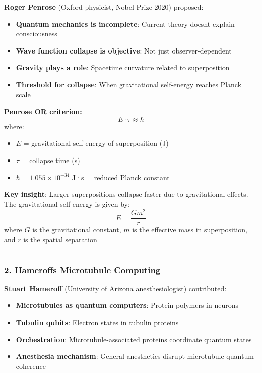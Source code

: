 \textbf{Roger Penrose} (Oxford physicist, Nobel Prize 2020) proposed:

\begin{itemize}
\tightlist
\item
  \textbf{Quantum mechanics is incomplete}: Current theory
  doesn\textquotesingle t explain consciousness
\item
  \textbf{Wave function collapse is objective}: Not just
  observer-dependent
\item
  \textbf{Gravity plays a role}: Spacetime curvature related to
  superposition
\item
  \textbf{Threshold for collapse}: When gravitational self-energy
  reaches Planck scale
\end{itemize}

\textbf{Penrose OR criterion:}
\begin{equation}
\label{eq:or-criterion}
E \cdot \tau \approx \hbar
\end{equation}
where:
\begin{itemize}
\item $E$ = gravitational self-energy of superposition (J)
\item $\tau$ = collapse time (s)
\item $\hbar = 1.055 \times 10^{-34}$ J·s = reduced Planck constant
\end{itemize}

\textbf{Key insight}: Larger superpositions collapse faster due to gravitational effects. The gravitational self-energy is given by:
\begin{equation}
\label{eq:grav-energy}
E = \frac{G m^2}{r}
\end{equation}
where $G$ is the gravitational constant, $m$ is the effective mass in superposition, and $r$ is the spatial separation

\begin{center}\rule{0.5\linewidth}{0.5pt}\end{center}

\subsubsection{2. Hameroff\textquotesingle s Microtubule
Computing}\label{hameroffs-microtubule-computing}

\textbf{Stuart Hameroff} (University of Arizona anesthesiologist)
contributed:

\begin{itemize}
\tightlist
\item
  \textbf{Microtubules as quantum computers}: Protein polymers in
  neurons
\item
  \textbf{Tubulin qubits}: Electron states in tubulin proteins
\item
  \textbf{Orchestration}: Microtubule-associated proteins coordinate
  quantum states
\item
  \textbf{Anesthesia mechanism}: General anesthetics disrupt microtubule
  quantum coherence
\end{itemize}

